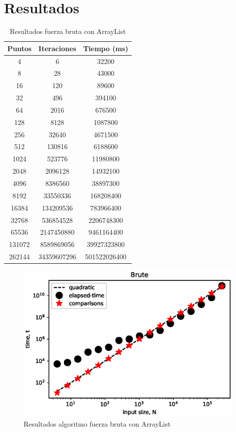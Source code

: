 \section{Resultados}
\begin{table}[h!]
    \centering
    \begin{tabular}{|c|c|c|}
    \hline
    Puntos & Iteraciones & Tiempo (ms)\\
    \hline
    4 & 6 & 32200\\
    \hline
    8 & 28 & 43000\\
    \hline
    16 & 120 & 89600 \\
    \hline
    32 & 496 & 394100\\
    \hline
    64 & 2016 & 676500\\
    \hline
    128 & 8128 & 1087800\\
    \hline
    256 & 32640 & 4671500\\
    \hline
    512 & 130816 & 6188600\\
    \hline
    1024 & 523776 & 11980800\\
    \hline
    2048 & 2096128 & 14932100\\
    \hline
    4096 & 8386560 & 38897300\\
    \hline
    8192 & 33550336 & 168208400\\
    \hline
    16384 & 134209536 & 783966400\\
    \hline
    32768 & 536854528 & 2206748300\\
    \hline
    65536 & 2147450880 & 9461164400 \\
    \hline
    131072 & 8589869056 & 39927323800\\
    \hline
    262144 & 34359607296 & 501522026400\\
    \hline
    \end{tabular}
    \caption{Resultados fuerza bruta con ArrayList}
    \label{tab:bruteAT}
\end{table}
\begin{figure}[h!]
    \centering
    \includegraphics[scale=0.8, center]{images/bruteArrayList.eps}
    \caption{ Resultados algoritmo fuerza bruta con ArrayList}
    \label{fig:bruteAG}
\end{figure}
